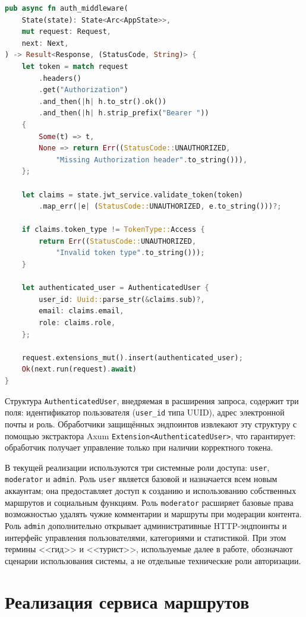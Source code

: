 \begin{lstlisting}[language=Rust, caption={Промежуточный слой аутентификации}, label={lst:auth-middleware}]
pub async fn auth_middleware(
    State(state): State<Arc<AppState>>,
    mut request: Request,
    next: Next,
) -> Result<Response, (StatusCode, String)> {
    let token = match request
        .headers()
        .get("Authorization")
        .and_then(|h| h.to_str().ok())
        .and_then(|h| h.strip_prefix("Bearer "))
    {
        Some(t) => t,
        None => return Err((StatusCode::UNAUTHORIZED,
            "Missing Authorization header".to_string())),
    };

    let claims = state.jwt_service.validate_token(token)
        .map_err(|e| (StatusCode::UNAUTHORIZED, e.to_string()))?;

    if claims.token_type != TokenType::Access {
        return Err((StatusCode::UNAUTHORIZED,
            "Invalid token type".to_string()));
    }

    let authenticated_user = AuthenticatedUser {
        user_id: Uuid::parse_str(&claims.sub)?,
        email: claims.email,
        role: claims.role,
    };

    request.extensions_mut().insert(authenticated_user);
    Ok(next.run(request).await)
}
\end{lstlisting}

Структура \texttt{AuthenticatedUser}, внедряемая в расширения запроса, содержит три поля: идентификатор пользователя (\texttt{user\_id} типа UUID), адрес электронной почты и роль. Обработчики защищённых эндпоинтов извлекают эту структуру с помощью экстрактора Axum \texttt{Extension<AuthenticatedUser>}, что гарантирует: обработчик получает управление только при наличии корректного токена.

В текущей реализации используются три системные роли доступа: \texttt{user}, \texttt{moderator} и \texttt{admin}. Роль \texttt{user} является базовой и назначается всем новым аккаунтам; она предоставляет доступ к созданию и использованию собственных маршрутов и социальным функциям. Роль \texttt{moderator} расширяет базовые права возможностью удалять чужие комментарии и маршруты при модерации контента. Роль \texttt{admin} дополнительно открывает административные HTTP-эндпоинты и интерфейс управления пользователями, категориями и статистикой. При этом термины <<гид>> и <<турист>>, используемые далее в работе, обозначают сценарии использования системы, а не отдельные технические роли авторизации.

\section{Реализация сервиса маршрутов}
\label{sec:routes-implementation}

